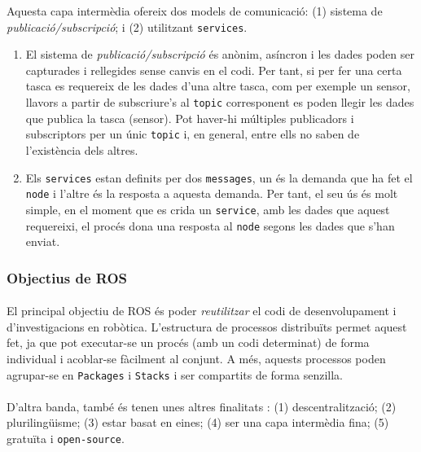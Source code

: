 \documentclass[12pt,a4paper,final,twoside]{article}
\begin{document}
Aquesta capa intermèdia ofereix dos models de comunicació: (1) sistema de \textit{publicació/subscripció}; i (2) utilitzant \texttt{services}.
\begin{enumerate}
\item El sistema de \textit{publicació/subscripció} és anònim, asíncron i les dades poden ser capturades i rellegides sense canvis en el codi. Per tant, si per fer una certa tasca es requereix de les dades d'una altre tasca, com per exemple un sensor, llavors a partir de subscriure's al \texttt{topic} corresponent es poden llegir les dades que publica la tasca (sensor). Pot haver-hi múltiples publicadors i subscriptors per un únic \texttt{topic} i, en general, entre ells no saben de l'existència dels altres.

\item Els \texttt{services} estan definits per dos \texttt{messages}, un és la demanda que ha fet el \texttt{node} i l'altre és la resposta a aquesta demanda. Per tant, el seu ús és molt simple, en el moment que es crida un \texttt{service}, amb les dades que aquest requereixi, el procés dona una resposta al \texttt{node} segons les dades que s'han enviat.
\end{enumerate}

\subsubsection{Objectius de ROS}

\paragraph{}El principal objectiu de ROS és poder \textit{reutilitzar} el codi de desenvolupament i d'investigacions en robòtica. L'estructura de processos distribuïts permet aquest fet, ja que pot executar-se un procés (amb un codi determinat) de forma individual i acoblar-se fàcilment al conjunt. A més, aquests processos poden agrupar-se en \texttt{Packages} i \texttt{Stacks} i ser compartits de forma senzilla.

\paragraph{}D'altra banda, també és tenen unes altres finalitats \cite{Quigley}: (1) descentralització; (2) plurilingüisme; (3) estar basat en eines; (4) ser una capa intermèdia fina; (5) gratuïta i \texttt{open-source}.
\end{document}
